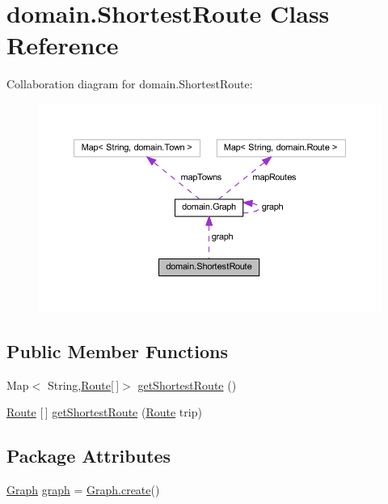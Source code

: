 \hypertarget{classdomain_1_1_shortest_route}{}\section{domain.\+Shortest\+Route Class Reference}
\label{classdomain_1_1_shortest_route}


Collaboration diagram for domain.\+Shortest\+Route\+:\nopagebreak
\begin{figure}[H]
\begin{center}
\leavevmode
\includegraphics[width=350pt]{classdomain_1_1_shortest_route__coll__graph}
\end{center}
\end{figure}
\subsection*{Public Member Functions}
\begin{DoxyCompactItemize}
\item 
Map$<$ String,\hyperlink{classdomain_1_1_route}{Route}\mbox{[}$\,$\mbox{]}$>$ \hyperlink{classdomain_1_1_shortest_route_a7ae44089b0d36ae422c678294425ed3f}{get\+Shortest\+Route} ()
\item 
\hyperlink{classdomain_1_1_route}{Route} \mbox{[}$\,$\mbox{]} \hyperlink{classdomain_1_1_shortest_route_a6378b797c933b6ebb2a48447761e02f7}{get\+Shortest\+Route} (\hyperlink{classdomain_1_1_route}{Route} trip)
\end{DoxyCompactItemize}
\subsection*{Package Attributes}
\begin{DoxyCompactItemize}
\item 
\hyperlink{classdomain_1_1_graph}{Graph} \hyperlink{classdomain_1_1_shortest_route_a3cc017eeb29651f61b8eac7f0e23c682}{graph} = \hyperlink{classdomain_1_1_graph_a57ce4efd344c059a565f4bb104fdee64}{Graph.\+create}()
\end{DoxyCompactItemize}


